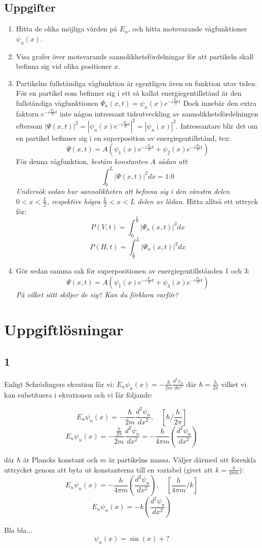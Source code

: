 \documentclass{article}
\newcommand{\wavefun}{\psi_n(x)}
\newcommand{\shrodequ}{E_n \psi_n(x) = - \frac{\hbar}{2m} \frac{d^2 \psi_n}{dx^2}}
\newcommand{\shrodprob}{|\psi_n(x)|^2}
\newcommand{\shrodtime}{e^{-i \frac{E_n}{\hbar} t}}
\newcommand{\fullshrodequ}{\Psi_n(x, t) = \psi_n(x) \shrodtime}
\newcommand{\fullshrodprob}{|\Psi_n(x,t)|^2}
\begin{document}
\subsection{Uppgifter}
\begin{enumerate}
	\item Hitta de olika möjliga värden på $E_n$, och hitta motsvarande vågfunktioner $\wavefun$. 
	\item Visa grafer över motsvarande sannolikhetsfördelningar för att partikeln skall befinna sig vid olika positioner $x$.

	\item Partikelns fullständiga vågfunktion är egentligen även en funktion utav tiden. För en partikel som befinner sig i ett så kallat energiegentillstånd är den fullständiga vågfunktionen $\fullshrodequ$
		Dock innebär den extra faktorn $\shrodtime$ inte någon intressant tidsutveckling av sannolikhetsfördelningen eftersom $|\Psi(x, t)|^2 = |\psi_n(x) \shrodtime|^2 = \shrodprob$. Intressantare blir det om en partikel befinner sig i en superposition av energiegentillstånd, tex: $$\Psi(x, t) = A(\psi_1(x)e^{-i \frac{E_1}{\hbar}t} + \psi_2(x) e^{-i \frac{E_2}{\hbar}t})$$ För denna vågfunktion, \emph{bestäm konstanten $A$ sådan att}: $$\int_0^L |\Psi(x, t)|^2 dx = 1.0$$ \emph{Undersök sedan hur sannolikheten att befinna sig i den vänstra delen $0 < x < \frac{L}{2}$, respektive högra $\frac{L}{2} < x < L$ delen av lådan}. Hitta alltså ett uttryck för: $$P(V, t) = \int_0^{\frac{L}{2}} \fullshrodprob dx$$ $$P(H, t) = \int_{\frac{L}{2}}^L \fullshrodprob dx$$

	\item Gör sedan samma sak för superpositionen av energiegentillstånden 1 och 3: $$\Psi(x, t) = A(\psi_1(x)e^{-i \frac{E_1}{\hbar}t} + \psi_3(x)e^{-i \frac{E_3}{\hbar}t})$$ \emph{På vilket sätt skiljer de sig? Kan du förklara varför?}
\end{enumerate}

\newpage

\section{Uppgiftlösningar}
\subsection{1}

Enligt Schrödingers ekvation får vi: $\shrodequ$ där $\hbar = \frac{h}{2\pi}$ vilket vi kan substituera i ekvationen och vi får följande:

$$
\shrodequ, \quad \left[\hbar / \frac{h}{2\pi}\right]
$$
$$
E_n\psi_n(x) = - \frac{\frac{h}{2\pi}}{2m} \frac{d^2 \psi_n}{dx^2} = - \frac{h}{4 \pi m} \left(\frac{d^2 \psi_n}{dx^2}\right)
$$

där $h$ är Plancks konstant och $m$ är partikelns massa. Väljer därmed att förenkla uttrycket genom att byta ut konstanterna till en variabel (givet att $k = \frac{h}{4 \pi m}$):
$$
E_n\psi_n(x) = - \frac{h}{4 \pi m} \left(\frac{d^2 \psi_n}{dx^2}\right), \quad \left[\frac{h}{4 \pi m}/k\right]
$$
$$
E_n\psi_n(x) = -k\left(\frac{d^2 \psi_n}{dx^2}\right)
$$

Bla bla...
$$
\psi_n(x) = \sin(x) + ?
$$
\end{document}

